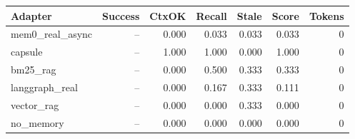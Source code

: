 \begin{tabular}{lrrrrrr}
\hline
Adapter & Success & CtxOK & Recall & Stale & Score & Tokens \\
\hline
mem0\_real\_async & -- & 0.000 & 0.033 & 0.033 & 0.033 & 0 \\
capsule & -- & 1.000 & 1.000 & 0.000 & 1.000 & 0 \\
bm25\_rag & -- & 0.000 & 0.500 & 0.333 & 0.333 & 0 \\
langgraph\_real & -- & 0.000 & 0.167 & 0.333 & 0.111 & 0 \\
vector\_rag & -- & 0.000 & 0.000 & 0.333 & 0.000 & 0 \\
no\_memory & -- & 0.000 & 0.000 & 0.000 & 0.000 & 0 \\
\hline
\end{tabular}
